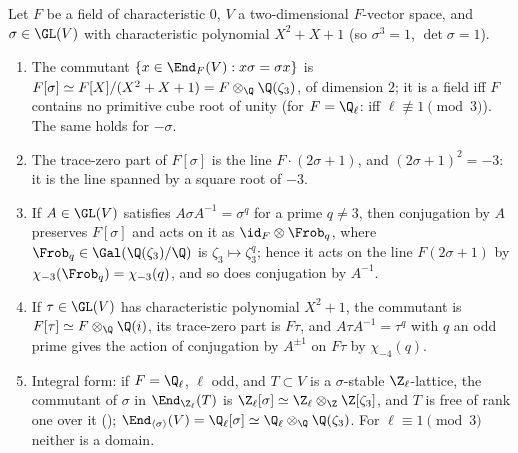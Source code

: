 \begin{proposition}\label{prop:ant:commutant}
Let $F$ be a field of characteristic $0$, $V$ a two-dimensional $F$-vector space, and $\sigma\in\GL(V)$ with characteristic polynomial $X^2+X+1$ (so
$\sigma^3=1$, $\det\sigma=1$).
\begin{enumerate}[label=(\roman*)]
\item The commutant $\{x\in\End_F(V):x\sigma=\sigma x\}$ is $F[\sigma]\simeq F[X]/(X^2+X+1)=F\otimes_\Q\Q(\zeta_3)$, of dimension $2$; it is a field iff $F$
contains no primitive cube root of unity (for $F=\Q_\ell$: iff $\ell\not\equiv1\pmod3$). The same holds for $-\sigma$.
\item The trace-zero part of $F[\sigma]$ is the line $F\cdot(2\sigma+1)$, and $(2\sigma+1)^2=-3$: it is the line spanned by a square root of $-3$.
\item If $A\in\GL(V)$ satisfies $A\sigma A^{-1}=\sigma^q$ for a prime $q\ne3$, then conjugation by $A$ preserves $F[\sigma]$ and acts on it as
$\id_F\otimes\Frob_q$, where $\Frob_q\in\Gal(\Q(\zeta_3)/\Q)$ is $\zeta_3\mapsto\zeta_3^q$; hence it acts on the line $F(2\sigma+1)$ by $\chi_{-3}(\Frob_q)=\chi_{-3}(q)$,
and so does conjugation by $A^{-1}$.
\item If $\tau\in\GL(V)$ has characteristic polynomial $X^2+1$, the commutant is $F[\tau]\simeq F\otimes_\Q\Q(i)$, its trace-zero part is $F\tau$, and
$A\tau A^{-1}=\tau^q$ with $q$ an odd prime gives the action of conjugation by $A^{\pm1}$ on $F\tau$ by $\chi_{-4}(q)$.
\item Integral form: if $F=\Q_\ell$, $\ell$ odd, and $T\subset V$ is a $\sigma$-stable $\Z_\ell$-lattice, the commutant of $\sigma$ in $\End_{\Z_\ell}(T)$ is
$\Z_\ell[\sigma]\simeq\Z_\ell\otimes_\Z\Z[\zeta_3]$, and $T$ is free of rank one over it (); $\End_{\langle\sigma\rangle}(V)=\Q_\ell[\sigma]\simeq
\Q_\ell\otimes_\Q\Q(\zeta_3)$. For $\ell\equiv1\pmod3$ neither is a domain.
\end{enumerate}
\end{proposition}

